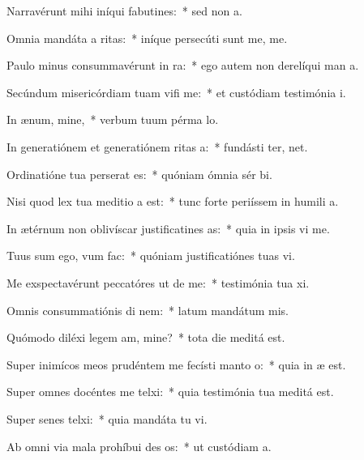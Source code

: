 \item Narravérunt mihi iníqui fabutines:~* sed non   a.
\item Omnia mandáta a ritas:~* iníque persecúti sunt me,  me.
\item Paulo minus consummavérunt  in ra:~* ego autem non derelíqui man a.
\item Secúndum misericórdiam tuam vifi me:~* et custódiam testimónia  i.
\item In ænum, mine,~* verbum tuum pérma  lo.
\item In generatiónem et generatiónem ritas a:~* fundásti ter,  net.
\item Ordinatióne tua perserat es:~* quóniam ómnia sér bi.
\item Nisi quod lex tua meditio a est:~* tunc forte periíssem in humili a.
\item In ætérnum non oblivíscar justificatines as:~* quia in ipsis vi me.
\item Tuus sum ego, vum  fac:~* quóniam justificatiónes tuas vi.
\item Me exspectavérunt peccatóres ut de me:~* testimónia tua xi.
\item Omnis consummatiónis di nem:~* latum mandátum  mis.
\item Quómodo diléxi legem am, mine?~* tota die meditá  est.
\item Super inimícos meos prudéntem me fecísti manto o:~* quia in æ  est.
\item Super omnes docéntes me telxi:~* quia testimónia tua meditá  est.
\item Super senes telxi:~* quia mandáta tu vi.
\item Ab omni via mala prohíbui des os:~* ut custódiam  a.
